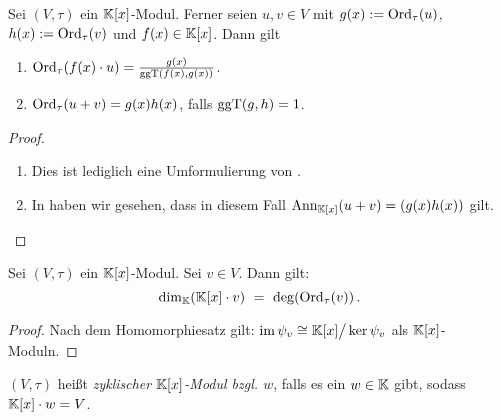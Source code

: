 \begin{lemma}
  \label{lemma:eigenschaften_tau_ordnung}
  Sei $(V,\tau)$ ein $\mathbb{K}[x]$-Modul. Ferner seien
  $u,v\in V$ mit $g(x) := \operatorname{Ord}_\tau(u)$, $h(x) := \operatorname{Ord}_\tau(v)$ und 
  $f(x) \in \mathbb{K}[x]$. Dann gilt
  \begin{enumerate}
    \item $\operatorname{Ord}_\tau(f(x)\cdot u) = \frac{g(x)}{\operatorname{ggT}(f(x),g(x))}$.
    \item $\operatorname{Ord}_\tau(u+v) = g(x)h(x)$, falls $\operatorname{ggT}(g,h) = 1$.
  \end{enumerate}
\end{lemma}
\begin{proof}
  \begin{enumerate}
    \item Dies ist lediglich eine Umformulierung von
      .
    \item In  haben wir gesehen, dass
      in diesem Fall $\operatorname{Ann}_{\mathbb{K}[x]}(u+v) = (g(x)h(x))$ gilt.
  \end{enumerate}
\end{proof}

\begin{lemma}
  \label{lemma:modul_dim_deg}
  Sei $(V,\tau)$ ein $\mathbb{K}[x]$-Modul. Sei $v\in V$. Dann gilt:
  \[ \dim_\mathbb{K}( \mathbb{K}[x]\cdot v ) \ =\  \deg( \operatorname{Ord}_\tau(v) )\,.\]
\end{lemma}
\begin{proof}
  Nach dem Homomorphiesatz gilt: 
  $ \operatorname{im}\psi_v \cong \mathbb{K}[x] \big/ \ker \psi_v$ als $\mathbb{K}[x]$-Moduln.
\end{proof}


\begin{definition}
  $(V,\tau)$ heißt \emph{zyklischer $\mathbb{K}[x]$-Modul bzgl. $w$}, falls es ein 
  $w\in \mathbb{K}$ gibt, sodass $\mathbb{K}[x]\cdot w = V$.
\end{definition}


